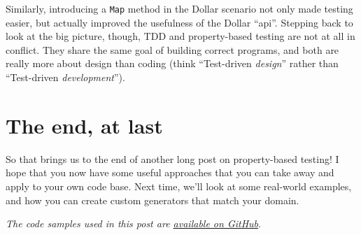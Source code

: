 Similarly, introducing a \texttt{Map} method in the Dollar scenario not
only made testing easier, but actually improved the usefulness of the
Dollar ``api''.
Stepping back to look at the big picture, though, TDD and property-based
testing are not at all in conflict. They share the same goal of building
correct programs, and both are really more about design than coding
(think ``Test-driven \emph{design}'' rather than ``Test-driven
\emph{development}'').

\section{The end, at last}
\label{the-end-at-last}

So that brings us to the end of another long post on property-based
testing! 
I hope that you now have some useful approaches that you can take away
and apply to your own code base.
Next time, we'll look at some real-world examples, and how you can
create custom generators that match your domain.

\emph{The code samples used in this post are
\href{https://github.com/swlaschin/PropertyBasedTesting/blob/master/part2.fsx}{available
on GitHub}}.
